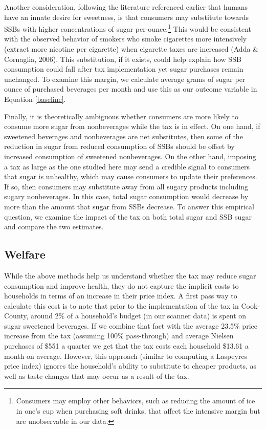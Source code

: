\documentclass[12pt]{article}
\begin{document}
Another consideration, following the literature referenced earlier that humans have an innate desire for sweetness, is that consumers may substitute towards SSBs with higher concentrations of sugar per-ounce.\footnote{Consumers may employ other behaviors, such as reducing the amount of ice in one's cup when purchasing soft drinks, that affect the intensive margin but are unobservable in our data.} This would be consistent with the observed behavior of smokers who smoke cigarettes more intensively (extract more nicotine per cigarette) when cigarette taxes are increased (Adda \& Cornaglia, 2006). This substitution, if it exists, could help explain how SSB consumption could fall after tax implementation yet sugar purchases remain unchanged. To examine this margin, we calculate average grams of sugar per ounce of purchased beverages per month and use this as our outcome variable in Equation \ref{baseline}.

Finally, it is theoretically ambiguous whether consumers are more likely to consume more sugar from nonbeverages while the tax is in effect. On one hand, if sweetened beverages and nonbeverages are net substitutes, then some of the reduction in sugar from reduced consumption of SSBs should be offset by increased consumption of sweetened nonbeverages. On the other hand, imposing a tax as large as the one studied here may send a credible signal to consumers that sugar is unhealthy, which may cause consumers to update their preferences. If so, then consumers may substitute away from all sugary products including sugary nonbeverages. In this case, total sugar consumption would decrease by more than the amount that sugar from SSBs decrease. To answer this empirical question, we examine the impact of the tax on both total sugar and SSB sugar and compare the two estimates.

\subsection{Welfare}
While the above methods help us understand whether the tax may reduce sugar consumption and improve health, they do not capture the implicit costs to households in terms of an increase in their price index. A first pass way to calculate this cost is to note that prior to the implementation of the tax in Cook-County, around 2\% of a household's budget (in our scanner data) is spent on sugar sweetened beverages. If we combine that fact with the average 23.5\% price increase from the tax (assuming 100\% pass-through) and average Nielsen purchases of \$551 a quarter we get that the tax costs each household \$13.61 a month on average. However, this approach (similar to computing a Laspeyres price index) ignores the household's ability to substitute to cheaper products, as well as taste-changes that may occur as a result of the tax.
\end{document}
